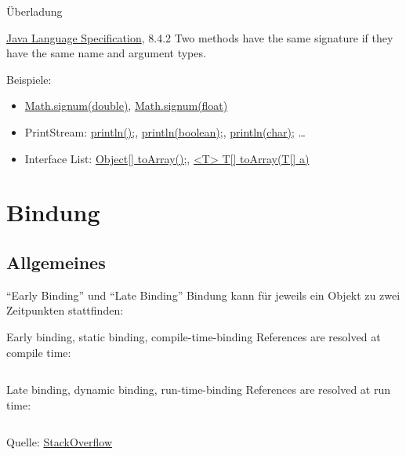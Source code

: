 \documentclass[usepdftitle=false,hyperref={pdfpagelabels=false}]{beamer}
\begin{document}
\begin{frame}{Überladung}
    \begin{block}{\href{http://docs.oracle.com/javase/specs/jls/se7/jls7.pdf}{Java Language Specification}, 8.4.2}
        Two methods have the same signature if they have the same name and argument types.
    \end{block}

    Beispiele:
    \begin{itemize}
        \item \href{http://docs.oracle.com/javase/7/docs/api/java/lang/Math.html\#signum(double)}{Math.signum(double)},
              \href{http://docs.oracle.com/javase/7/docs/api/java/lang/Math.html\#signum(float)}{Math.signum(float)}
        \item PrintStream:
              \href{http://docs.oracle.com/javase/7/docs/api/java/io/PrintStream.html\#println()}{println();}, 
              \href{http://docs.oracle.com/javase/7/docs/api/java/io/PrintStream.html\#println(boolean)}{println(boolean);},
              \href{http://docs.oracle.com/javase/7/docs/api/java/io/PrintStream.html\#println(char)}{println(char);} \dots
        \item Interface List: 
              \href{http://docs.oracle.com/javase/7/docs/api/java/util/List.html\#toArray()}{Object[] toArray();},
              \href{http://docs.oracle.com/javase/7/docs/api/java/util/List.html\#toArray(T[])}{<T> T[] toArray(T[] a)}
    \end{itemize}
\end{frame}

\section{Bindung}
\subsection{Allgemeines}

\begin{frame}{"`Early Binding"' und "`Late Binding"'}
    Bindung kann für jeweils ein Objekt zu zwei Zeitpunkten stattfinden:
    \begin{block}{Early binding, static binding, compile-time-binding}
        References are resolved at compile time:
        \inputminted[linenos=false, numbersep=5pt, tabsize=4, fontsize=\small, firstline=5, lastline=7]{java}{singleLines.java}
    \end{block}

    \begin{block}{Late binding, dynamic binding, run-time-binding}
        References are resolved at run time:
        \inputminted[linenos=false, numbersep=5pt, tabsize=4, fontsize=\small, firstline=9, lastline=13]{java}{singleLines.java}
    \end{block}
    {\tiny Quelle: \href{http://stackoverflow.com/a/640990/562769}{StackOverflow}}
\end{frame}
\end{document}
